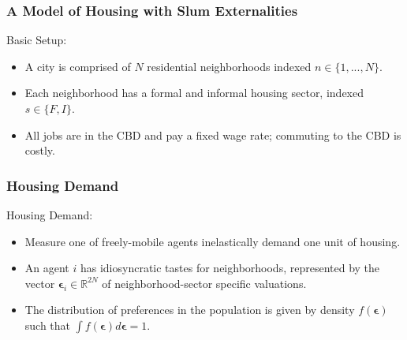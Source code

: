 \documentclass[aspectratio=149]{beamer}
\begin{document}



\begin{frame}
\frametitle{A Model of Housing with Slum Externalities}

Basic Setup:
\vspace{2mm}
\begin{itemize}
  \item A city is comprised of $N$ residential neighborhoods indexed $n\in\{1,...,N\}$. 
  \vspace{2mm}
  \item Each neighborhood has a formal and informal housing sector, indexed $s\in\{F,I\}$.
  \vspace{2mm}
  \item All jobs are in the CBD and pay a fixed wage rate; commuting to the CBD is costly.
\end{itemize}


\end{frame}


\begin{frame}
\frametitle{Housing Demand}

Housing Demand:
\vspace{2mm}
\begin{itemize}
  \item Measure one of freely-mobile agents inelastically demand one unit of housing.
  \vspace{2mm}
  \item An agent $i$ has idiosyncratic tastes for neighborhoods, represented by the vector $\bm{\epsilon}_i \in \mathbb{R}^{2N}$ of neighborhood-sector specific valuations.
  \vspace{2mm}
  \item The distribution of preferences in the population is given by density $f(\bm{\epsilon})$ such that $\int f(\bm{\epsilon}) d\bm{\epsilon} = 1$.
\end{itemize}


\end{frame}

\end{document}
